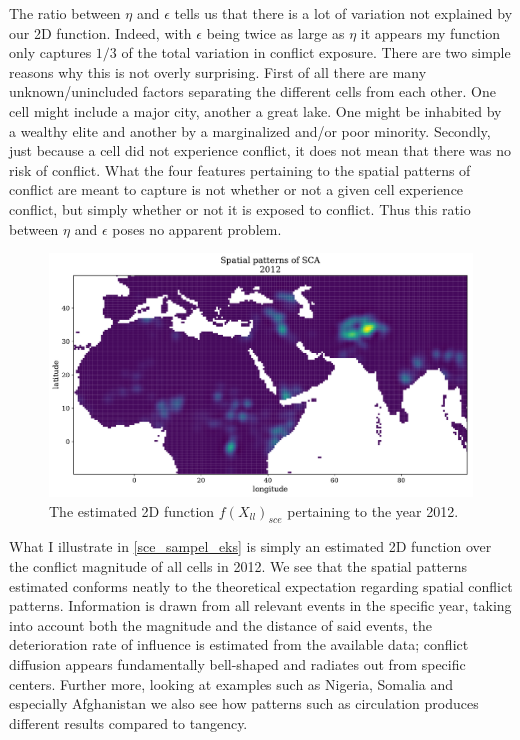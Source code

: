 \documentclass[a4paper]{article}
\begin{document}
The ratio between $\eta$ and $\epsilon$ tells us that there is a lot of variation not explained by our 2D function. Indeed, with $\epsilon$ being twice as large as $\eta$ it appears my function only captures $1/3$ of the total variation in conflict exposure. There are two simple reasons why this is not overly surprising. First of all there are many unknown/unincluded factors separating the different cells from each other. One cell might include a major city, another a great lake. One might be inhabited by a wealthy elite and another by a marginalized and/or poor minority. Secondly, just because a cell did not experience conflict, it does not mean that there was no risk of conflict. What the four features pertaining to the spatial patterns of conflict are meant to capture is not whether or not a given cell experience conflict, but simply whether or not it is exposed to conflict. Thus this ratio between $\eta$ and $\epsilon$ poses no apparent problem.\par

\begin{figure}[!htb]
	\centering
	\includegraphics[scale=0.47]{sce_2012_samples.pdf}
    \caption{\footnotesize{The estimated 2D function $f(X_{ll})_{sce}$ pertaining to the year 2012.}}\label{sce_sampel_eks}
\end{figure}

What I illustrate in \autoref{sce_sampel_eks} is simply an estimated 2D function over the conflict magnitude of all cells in 2012. We see that the spatial patterns estimated conforms neatly to the theoretical expectation regarding spatial conflict patterns. Information is drawn from all relevant events in the specific year, taking into account both the magnitude and the distance of said events, the deterioration rate of influence is estimated from the available data; conflict diffusion appears fundamentally bell-shaped and radiates out from specific centers. Further more, looking at examples such as Nigeria, Somalia and especially Afghanistan we also see how patterns such as circulation produces different results compared to tangency.\par  
\end{document}

